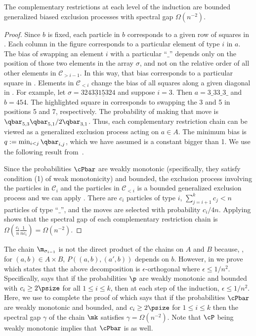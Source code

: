 \documentclass{toc}
\begin{document}
\begin{lemma}\label{lem:dual}
The complementary restrictions at each level of the induction are 
bounded generalized biased exclusion processes with spectral gap 
$\Omega(n^{-2})$.
\end{lemma}
\begin{proof}
Since $b$ is fixed, each particle in $b$ corresponds to a given row of 
squares in .  Each column in the figure 
corresponds to a particular element of type $i$ in $a$.  The bias of 
swapping an element $i$ with a particular ``$\_$'' depends only on the 
position of those two elements in the array $\sigma$, and not on the 
relative order of all other elements in $\mathcal{C}_{> i-1}$.  In 
this way, that bias corresponds to a particular square in 
.  Elements in $\mathcal{C}_{<i}$ change the 
bias of all squares along a given diagonal in 
.  For example, let $\sigma = 
3243\underline{3}1\underline{5}324$ and suppose $i=3$.  Then 
$a=3\_33\_3\_$ and $b=454$.  The highlighted square in 
 corresponds to swapping the 3 and 5 in 
positions 5 and 7, respectively.  The probability of making that move 
is $\qbar_{5,3}\qbar_{5,1}/2\qbar_{3,1}$.  Thus, each complementary 
restriction chain can be viewed as a generalized exclusion process 
acting on $a\in A$.  The minimum bias is $q:=\min_{i<j} \qbar_{i,j}$, 
which we have assumed is a constant bigger than 1. We use the following 
result from~\cite{MS}.


\noindent Since the probabilities $\cPbar$ are weakly monotonic 
(specifically, they satisfy condition (1) of weak monotonicity) and 
bounded, the exclusion process involving the particles in 
$\mathcal{C}_{i}$ and the particles in $\mathcal{C}_{<i}$ is a 
bounded generalized exclusion process and we can apply 
.  There are $c_i$ particles of type $i$, 
$\sum_{j=i+1}^k c_j < n$ particles of type ``$\_$'', and the moves are 
selected with probability $c_i/4n$.  Applying 
 shows that the spectral gap of each 
complementary restriction chain is 
$\Omega(\frac{c_{i}}{n}\frac{1}{nc_{i}})=\Omega(n^{-2})$. \end{proof}


The chain $\m_{\sigma_{i-1}}$ is not the direct product of the chains 
on $A$ and $B$ because, \eg, for $(a,b) \in A\times B$, 
$P((a,b),(a',b))$ depends on $b$. However, in  
we prove  which states that the above 
decomposition is 
%
$\epsilon$-orthogonal where $\epsilon\leq 1/n^2$.%
Specifically,  says that if the probabilities $\p$ are weakly monotonic and bounded with 
$c_i\geq 2\psize$ for all $1\leq i \leq k$, then at each step of 
the induction, %
$\epsilon\leq 1/n^2$. %
Here, we use 
 to complete the proof of  
which says that if the probabilities $\cPbar$ are weakly monotonic and 
bounded, and  $c_i\geq 2\psize$ for $1\leq i \leq k$ then the spectral 
gap $\gamma$ 
of the chain $\mk$ satisfies $\gamma =\Omega(n^{-2})$.  Note that
$\cP$ being weakly monotonic implies that $\cPbar$ is as well.
%
\end{document}

